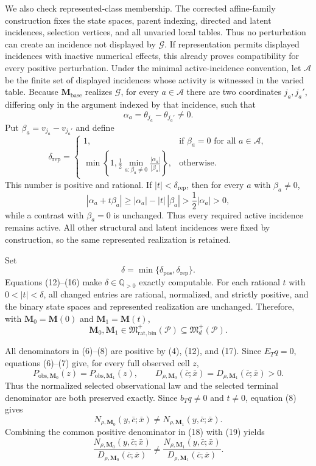We also check represented-class membership.  The corrected affine-family construction fixes the state spaces, parent indexing, directed and latent incidences, selection vertices, and all unvaried local tables.  Thus no perturbation can create an incidence not displayed by \(\mathcal G\).  If representation permits displayed incidences with inactive numerical effects, this already proves compatibility for every positive perturbation.  Under the minimal active-incidence convention, let \(\mathcal A\) be the finite set of displayed incidences whose activity is witnessed in the varied table.  Because \(\mathbf M_{\mathrm{base}}\) realizes \(\mathcal G\), for every \(a\in\mathcal A\) there are two coordinates \(j_a,j_a'\), differing only in the argument indexed by that incidence, such that
\[
 \alpha_a=\theta_{j_a}-\theta_{j_a'}\ne0.                     \tag{13}
\]
Put \(\beta_a=v_{j_a}-v_{j_a'}\) and define
\[
 \delta_{\mathrm{rep}}
 =\begin{cases}
 1,&\text{if }\beta_a=0\text{ for all }a\in\mathcal A,\\[1mm]
 \displaystyle\min\!\left\{1,
   \frac12\min_{a:\beta_a\ne0}\frac{|\alpha_a|}{|\beta_a|}\right\},
 &\text{otherwise}.
 \end{cases}                                                    \tag{14}
\]
This number is positive and rational.  If \(|t|<\delta_{\mathrm{rep}}\), then for every \(a\) with \(\beta_a\ne0\),
\[
 |\alpha_a+t\beta_a|
 \ge |\alpha_a|-|t|\,|\beta_a|
 >\frac12|\alpha_a|>0,                                        \tag{15}
\]
while a contrast with \(\beta_a=0\) is unchanged.  Thus every required active incidence remains active.  All other structural and latent incidences were fixed by construction, so the same represented realization is retained.

Set
\[
 \delta=\min\{\delta_{\mathrm{pos}},\delta_{\mathrm{rep}}\}. \tag{16}
\]
Equations (12)--(16) make \(\delta\in\mathbb Q_{>0}\) exactly computable.  For each rational \(t\) with \(0<|t|<\delta\), all changed entries are rational, normalized, and strictly positive, and the binary state spaces and represented realization are unchanged.  Therefore, with \(\mathbf M_0=\mathbf M(0)\) and \(\mathbf M_1=\mathbf M(t)\),
\[
 \mathbf M_0,\mathbf M_1
 \in\mathfrak M_{\mathrm{rat,bin}}^+(\mathcal P)
 \subseteq\mathfrak M_d^+(\mathcal P).                         \tag{17}
\]

All denominators in (6)--(8) are positive by (4), (12), and (17).  Since \(E_Tq=0\), equations (6)--(7) give, for every full observed cell \(z\),
\[
 P_{\mathrm{obs},\mathbf M_0}(z)=P_{\mathrm{obs},\mathbf M_1}(z),
 \qquad
 D_{\rho,\mathbf M_0}(\bar c;\bar x)
 =D_{\rho,\mathbf M_1}(\bar c;\bar x)>0.                     \tag{18}
\]
Thus the normalized selected observational law and the selected terminal denominator are both preserved exactly.  Since \(b_Tq\ne0\) and \(t\ne0\), equation (8) gives
\[
 N_{\rho,\mathbf M_0}(y,\bar c;\bar x)
 \ne N_{\rho,\mathbf M_1}(y,\bar c;\bar x).                 \tag{19}
\]
Combining the common positive denominator in (18) with (19) yields
\[
 \frac{N_{\rho,\mathbf M_0}(y,\bar c;\bar x)}
      {D_{\rho,\mathbf M_0}(\bar c;\bar x)}
 \ne
 \frac{N_{\rho,\mathbf M_1}(y,\bar c;\bar x)}
      {D_{\rho,\mathbf M_1}(\bar c;\bar x)}.                 \tag{20}
\]


